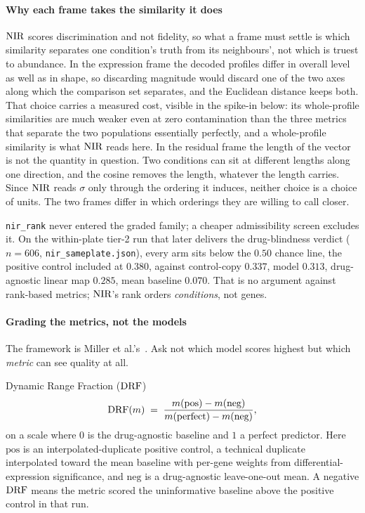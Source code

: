 \paragraph{Why each frame takes the similarity it does} $\textrm{NIR}$ scores
discrimination and not fidelity, so what a frame must settle is which similarity
separates one condition's truth from its neighbours', not which is truest to
abundance. In the expression frame the decoded profiles differ in overall level
as well as in shape, so discarding magnitude would discard one of the two axes
along which the comparison set separates, and the Euclidean distance keeps both.
That choice carries a measured cost, visible in the spike-in below: its
whole-profile similarities are much weaker even at zero contamination than the
three metrics that separate the two populations essentially perfectly, and a
whole-profile similarity is what $\textrm{NIR}$ reads here. In the residual frame the
length of the vector is not the quantity in question. Two conditions can sit at
different lengths along one direction, and the cosine removes the length,
whatever the length carries. Since $\textrm{NIR}$ reads $\sigma$ only through the
ordering it induces, neither choice is a choice of units. The two frames differ
in which orderings they are willing to call closer.

\texttt{nir\_rank} never entered the graded family; a cheaper admissibility
screen excludes it. On the within-plate tier-2 run that later delivers the
drug-blindness verdict ($n = \num{606}$, \texttt{nir\_sameplate.json}), every arm
sits below the $0.50$ chance line, the positive control included at $0.380$,
against control-copy $0.337$, model $0.313$, drug-agnostic linear map $0.285$,
mean baseline $0.070$. That is no argument against rank-based metrics;
$\textrm{NIR}$'s rank orders \emph{conditions}, not genes.

\paragraph{Grading the metrics, not the models} The framework is Miller
et al.'s~\cite{miller}. Ask not which model scores highest but which
\emph{metric} can see quality at all.

\begin{defn}{Dynamic Range Fraction ($\textrm{DRF}$)}
\begin{equation}
 \DRF(m) \;=\; \frac{m(\textrm{pos}) - m(\textrm{neg})}%
 {m(\textrm{perfect}) - m(\textrm{neg})},
\end{equation}
on a scale where $0$ is the drug-agnostic baseline and $1$ a perfect predictor.
Here $\textrm{pos}$ is an interpolated-duplicate positive control, a technical
duplicate interpolated toward the mean baseline with per-gene weights from
differential-expression significance, and $\textrm{neg}$ is a drug-agnostic
leave-one-out mean. A negative $\textrm{DRF}$ means the metric scored the uninformative
baseline above the positive control in that run.
\end{defn}

